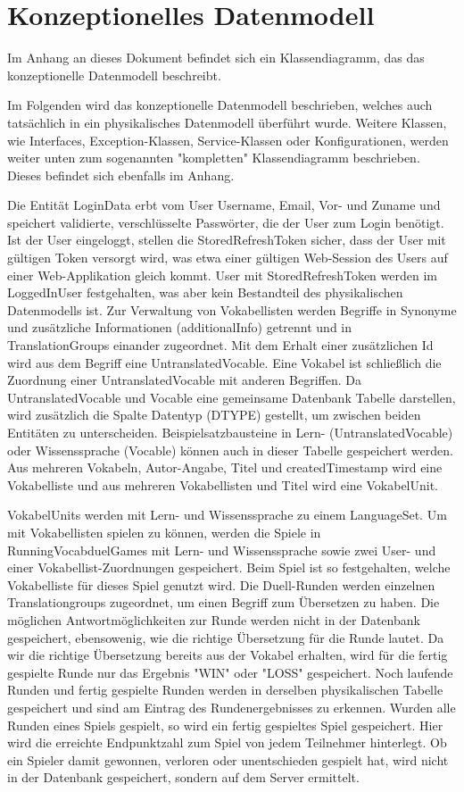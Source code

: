 \section{Konzeptionelles Datenmodell}\label{sec:konzeptionelles-datenmodell}

Im Anhang an dieses Dokument befindet sich ein Klassendiagramm, das das konzeptionelle Datenmodell beschreibt.

Im Folgenden wird das konzeptionelle Datenmodell beschrieben, welches auch tatsächlich in ein physikalisches Datenmodell überführt wurde.
Weitere Klassen, wie Interfaces, Exception-Klassen, Service-Klassen oder Konfigurationen,
werden weiter unten zum sogenannten "kompletten" Klassendiagramm beschrieben.
Dieses befindet sich ebenfalls im Anhang.

Die Entität LoginData erbt vom User Username, Email, Vor- und Zuname und speichert validierte, verschlüsselte Passwörter, die der User zum Login benötigt.
Ist der User eingeloggt, stellen die StoredRefreshToken sicher, dass der User mit gültigen Token versorgt wird, was etwa
einer gültigen Web-Session des Users auf einer Web-Applikation gleich kommt.
User mit StoredRefreshToken werden im LoggedInUser festgehalten, was aber kein Bestandteil des physikalischen Datenmodells ist.
Zur Verwaltung von Vokabellisten werden Begriffe in Synonyme und zusätzliche Informationen (additionalInfo) getrennt und in TranslationGroups einander zugeordnet.
Mit dem Erhalt einer zusätzlichen Id wird aus dem Begriff eine UntranslatedVocable.
Eine Vokabel ist schließlich die Zuordnung einer UntranslatedVocable mit anderen Begriffen.
Da UntranslatedVocable und Vocable eine gemeinsame Datenbank Tabelle darstellen,
wird zusätzlich die Spalte Datentyp (DTYPE) gestellt, um zwischen beiden Entitäten zu unterscheiden.
Beispielsatzbausteine in Lern- (UntranslatedVocable) oder Wissenssprache (Vocable) können auch in dieser Tabelle gespeichert werden.
Aus mehreren Vokabeln, Autor-Angabe, Titel und createdTimestamp wird eine Vokabelliste und aus mehreren Vokabellisten und Titel
wird eine VokabelUnit.

VokabelUnits werden mit Lern- und Wissenssprache zu einem LanguageSet.
Um mit Vokabellisten spielen zu können, werden die Spiele in RunningVocabduelGames mit Lern- und Wissenssprache sowie zwei User- und einer Vokabellist-Zuordnungen gespeichert.
Beim Spiel ist so festgehalten, welche Vokabelliste für dieses Spiel genutzt wird. Die Duell-Runden werden einzelnen Translationgroups zugeordnet, um einen Begriff zum Übersetzen zu haben.
Die möglichen Antwortmöglichkeiten zur Runde werden nicht in der Datenbank gespeichert, ebensowenig, wie die richtige Übersetzung für die Runde lautet.
Da wir die richtige Übersetzung bereits aus der Vokabel erhalten, wird für die fertig gespielte Runde nur das Ergebnis "WIN" oder "LOSS" gespeichert.
Noch laufende Runden und fertig gespielte Runden werden in derselben physikalischen Tabelle gespeichert und sind am Eintrag des Rundenergebnisses zu erkennen.
Wurden alle Runden eines Spiels gespielt, so wird ein fertig gespieltes Spiel gespeichert. Hier wird die erreichte Endpunktzahl zum Spiel von jedem Teilnehmer hinterlegt.
Ob ein Spieler damit gewonnen, verloren oder unentschieden gespielt hat, wird nicht in der Datenbank gespeichert, sondern auf dem Server ermittelt.
